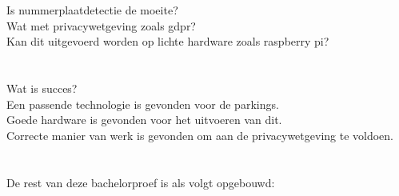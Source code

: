 \section{}
\label{sec:onderzoeksvraag}


Is nummerplaatdetectie de moeite?\\
Wat met privacywetgeving zoals gdpr?\\
Kan dit uitgevoerd worden op lichte hardware zoals raspberry pi?

\section{}
\label{sec:onderzoeksdoelstelling}


Wat is succes?\\
Een passende technologie is gevonden voor de parkings.\\
Goede hardware is gevonden voor het uitvoeren van dit.\\
Correcte manier van werk is gevonden om aan de privacywetgeving te voldoen.

\section{}
\label{sec:opzet-bachelorproef}


De rest van deze bachelorproef is als volgt opgebouwd:

